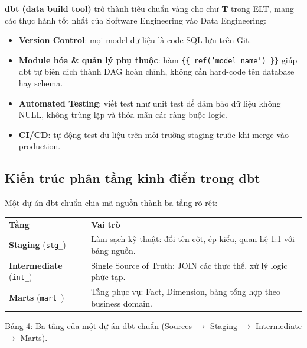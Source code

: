 \documentclass[12pt]{article}
\begin{document}
\textbf{dbt (data build tool)} trở thành tiêu chuẩn vàng cho chữ \textbf{T} trong ELT, mang các thực hành tốt nhất của Software Engineering vào Data Engineering:
\begin{itemize}
    \item \textbf{Version Control}: mọi model dữ liệu là code SQL lưu trên Git.
    \item \textbf{Module hóa \& quản lý phụ thuộc}: hàm \texttt{\{\{ ref('model\_name') \}\}} giúp dbt tự biên dịch thành DAG hoàn chỉnh, không cần hard-code tên database hay schema.
    \item \textbf{Automated Testing}: viết test như unit test để đảm bảo dữ liệu không NULL, không trùng lặp và thỏa mãn các ràng buộc logic.
    \item \textbf{CI/CD}: tự động test dữ liệu trên môi trường staging trước khi merge vào production.
\end{itemize}

\subsection{Kiến trúc phân tầng kinh điển trong dbt}

Một dự án dbt chuẩn chia mã nguồn thành ba tầng rõ rệt:

\noindent
\begin{longtable}{@{}>{\RaggedRight\arraybackslash}p{3.6cm}>{\RaggedRight\arraybackslash}p{12.2cm}@{}}
\rowcolor{rowLavender}
\textbf{Tầng} & \textbf{Vai trò} \\
\addlinespace[3pt]
\endhead
\textbf{Staging} (\texttt{stg\_}) & Làm sạch kỹ thuật: đổi tên cột, ép kiểu, quan hệ 1:1 với bảng nguồn. \\
\addlinespace[3pt]
\textbf{Intermediate} (\texttt{int\_}) & Single Source of Truth: JOIN các thực thể, xử lý logic phức tạp. \\
\addlinespace[3pt]
\textbf{Marts} (\texttt{mart\_}) & Tầng phục vụ: Fact, Dimension, bảng tổng hợp theo business domain. \\
\end{longtable}

\begin{captionbelowboxaivn}
Bảng 4: Ba tầng của một dự án dbt chuẩn (Sources $\rightarrow$ Staging $\rightarrow$ Intermediate $\rightarrow$ Marts).
\end{captionbelowboxaivn}
\end{document}
